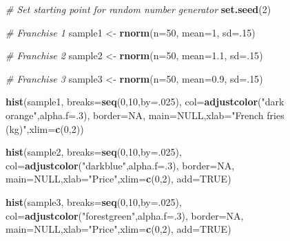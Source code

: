 \documentclass[]{book}
\newenvironment{Shaded}{\begin{snugshade}}{\end{snugshade}}
\newcommand{\CommentTok}[1]{\textcolor[rgb]{0.56,0.35,0.01}{\textit{#1}}}
\newcommand{\DataTypeTok}[1]{\textcolor[rgb]{0.13,0.29,0.53}{#1}}
\newcommand{\DecValTok}[1]{\textcolor[rgb]{0.00,0.00,0.81}{#1}}
\newcommand{\FloatTok}[1]{\textcolor[rgb]{0.00,0.00,0.81}{#1}}
\newcommand{\KeywordTok}[1]{\textcolor[rgb]{0.13,0.29,0.53}{\textbf{#1}}}
\newcommand{\NormalTok}[1]{#1}
\newcommand{\OtherTok}[1]{\textcolor[rgb]{0.56,0.35,0.01}{#1}}
\newcommand{\StringTok}[1]{\textcolor[rgb]{0.31,0.60,0.02}{#1}}
\begin{document}
\begin{Shaded}
\begin{Highlighting}[]
\CommentTok{# Set starting point for random number generator}
\KeywordTok{set.seed}\NormalTok{(}\DecValTok{2}\NormalTok{)}

\CommentTok{# Franchise 1}
\NormalTok{sample1 <-}\StringTok{ }\KeywordTok{rnorm}\NormalTok{(}\DataTypeTok{n=}\DecValTok{50}\NormalTok{, }\DataTypeTok{mean=}\DecValTok{1}\NormalTok{, }\DataTypeTok{sd=}\NormalTok{.}\DecValTok{15}\NormalTok{)}

\CommentTok{# Franchise 2}
\NormalTok{sample2 <-}\StringTok{ }\KeywordTok{rnorm}\NormalTok{(}\DataTypeTok{n=}\DecValTok{50}\NormalTok{, }\DataTypeTok{mean=}\FloatTok{1.1}\NormalTok{, }\DataTypeTok{sd=}\NormalTok{.}\DecValTok{15}\NormalTok{)}

\CommentTok{# Franchise 3}
\NormalTok{sample3 <-}\StringTok{ }\KeywordTok{rnorm}\NormalTok{(}\DataTypeTok{n=}\DecValTok{50}\NormalTok{, }\DataTypeTok{mean=}\FloatTok{0.9}\NormalTok{, }\DataTypeTok{sd=}\NormalTok{.}\DecValTok{15}\NormalTok{)}

\KeywordTok{hist}\NormalTok{(sample1,}
     \DataTypeTok{breaks=}\KeywordTok{seq}\NormalTok{(}\DecValTok{0}\NormalTok{,}\DecValTok{10}\NormalTok{,}\DataTypeTok{by=}\NormalTok{.}\DecValTok{025}\NormalTok{),}
     \DataTypeTok{col=}\KeywordTok{adjustcolor}\NormalTok{(}\StringTok{"dark orange"}\NormalTok{,}\DataTypeTok{alpha.f=}\NormalTok{.}\DecValTok{3}\NormalTok{),}
     \DataTypeTok{border=}\OtherTok{NA}\NormalTok{,}
     \DataTypeTok{main=}\OtherTok{NULL}\NormalTok{,}\DataTypeTok{xlab=}\StringTok{"French fries (kg)"}\NormalTok{,}\DataTypeTok{xlim=}\KeywordTok{c}\NormalTok{(}\DecValTok{0}\NormalTok{,}\DecValTok{2}\NormalTok{))}

\KeywordTok{hist}\NormalTok{(sample2,}
     \DataTypeTok{breaks=}\KeywordTok{seq}\NormalTok{(}\DecValTok{0}\NormalTok{,}\DecValTok{10}\NormalTok{,}\DataTypeTok{by=}\NormalTok{.}\DecValTok{025}\NormalTok{),}
     \DataTypeTok{col=}\KeywordTok{adjustcolor}\NormalTok{(}\StringTok{"darkblue"}\NormalTok{,}\DataTypeTok{alpha.f=}\NormalTok{.}\DecValTok{3}\NormalTok{),}
     \DataTypeTok{border=}\OtherTok{NA}\NormalTok{,}
     \DataTypeTok{main=}\OtherTok{NULL}\NormalTok{,}\DataTypeTok{xlab=}\StringTok{"Price"}\NormalTok{,}\DataTypeTok{xlim=}\KeywordTok{c}\NormalTok{(}\DecValTok{0}\NormalTok{,}\DecValTok{2}\NormalTok{),}
     \DataTypeTok{add=}\OtherTok{TRUE}\NormalTok{)}

\KeywordTok{hist}\NormalTok{(sample3,}
     \DataTypeTok{breaks=}\KeywordTok{seq}\NormalTok{(}\DecValTok{0}\NormalTok{,}\DecValTok{10}\NormalTok{,}\DataTypeTok{by=}\NormalTok{.}\DecValTok{025}\NormalTok{),}
     \DataTypeTok{col=}\KeywordTok{adjustcolor}\NormalTok{(}\StringTok{"forestgreen"}\NormalTok{,}\DataTypeTok{alpha.f=}\NormalTok{.}\DecValTok{3}\NormalTok{),}
     \DataTypeTok{border=}\OtherTok{NA}\NormalTok{,}
     \DataTypeTok{main=}\OtherTok{NULL}\NormalTok{,}\DataTypeTok{xlab=}\StringTok{"Price"}\NormalTok{,}\DataTypeTok{xlim=}\KeywordTok{c}\NormalTok{(}\DecValTok{0}\NormalTok{,}\DecValTok{2}\NormalTok{),}
     \DataTypeTok{add=}\OtherTok{TRUE}\NormalTok{)}
\end{Highlighting}
\end{Shaded}
\end{document}
